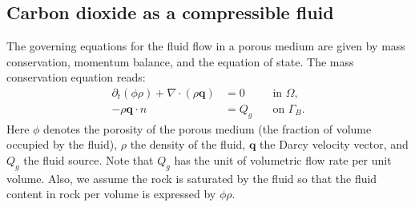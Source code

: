 
\subsection{Carbon dioxide as a compressible fluid} \label{Sec:CO2}
The governing equations for the fluid flow in a porous medium are given by mass conservation, momentum balance, and the equation of state.
The mass conservation equation reads:
\begin{equation}\label{Eq:Mass_Conserv}
    \begin{aligned}
        \partial_t\left(\phi\rho\right)  +\nabla\cdot\left(\rho\bm{q}\right)&=0  \quad  &\text{in~} \Omega, \\
    -\rho\bm{q} \cdot n &=Q_g  \quad  &\text{on~} \Gamma_B.       
    \end{aligned}
\end{equation}
Here $\phi$ denotes the porosity of the porous medium (the fraction of volume occupied by the fluid), $\rho$ the density of the fluid, $\bm{q}$ the Darcy velocity vector, and $Q_g$ the fluid source. Note that $Q_g$ has the unit of volumetric flow rate per unit volume. Also, we assume the rock is saturated by the fluid so that the fluid content in rock per volume is expressed by $\phi\rho$.


